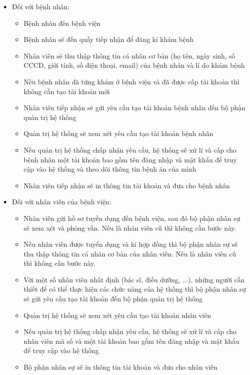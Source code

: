 \begin{itemize}
    \item Đối với bệnh nhân: 
        \begin{itemize}
            \item Bệnh nhân đến bệnh viện
            \item Bệnh nhân sẽ đến quầy tiếp nhận để đăng kí khám bệnh
            \item Nhân viên sẽ thu thập thông tin cá nhân cơ bản (họ tên, ngày sinh, số CCCD, giới tính, số điện thoại, email) của bệnh nhân và lí do khám bệnh
            \item Nếu bệnh nhân đã từng khám ở bệnh viện và đã được cấp tài khoản thì không cần tạo tài khoản mới
            \item Nhân viên tiếp nhận sẽ gửi yêu cầu tạo tài khoản bệnh nhân đến bộ phận quản trị hệ thống
            \item Quản trị hệ thống sẽ xem xét yêu cầu tạo tài khoản bệnh nhân
            \item Nếu quản trị hệ thống chấp nhận yêu cầu, hệ thống sẽ xử lí và cấp cho bệnh nhân một tài khoản bao gồm tên đăng nhập và mật khẩu để truy cập vào hệ thống và theo dõi thông tin bệnh án của mình
            \item Nhân viên tiếp nhận sẽ in thông tin tài khoản và đưa cho bệnh nhân
        \end{itemize} 
    \item Đối với nhân viên của bệnh viện:
        \begin{itemize}
            \item Nhân viên gửi hồ sơ tuyền dụng đến bệnh viện, sau đó bộ phận nhân sự sẽ xem xét và phỏng vấn. Nếu là nhân viên cũ thì không cần bước này.
            \item Nếu nhân viên được tuyển dụng và kí hợp đồng thì bộ phận nhân sự sẽ thu thập thông tin cá nhân cơ bản của nhân viên. Nếu là nhân viên cũ thì không cần bước này.
            \item Với một số nhân viên nhất định (bác sĩ, điều dưỡng, ...), những người cần thiết để có thể thực hiện các chức năng của hệ thống thì bộ phận nhân sự sẽ gửi yêu cầu tạo tài khoản đến bộ phận quản trị hệ thống
            \item Quản trị hệ thống sẽ xem xét yêu cầu tạo tài khoản nhân viên
            \item Nếu quản trị hệ thống chấp nhận yêu cầu, hệ thống sẽ xử lí và cấp cho nhân viên mã số và một tài khoản bao gồm tên đăng nhập và mật khẩu để truy cập vào hệ thống
            \item Bộ phận nhân sự sẽ in thông tin tài khoản và đưa cho nhân viên
        \end{itemize}
\end{itemize}


